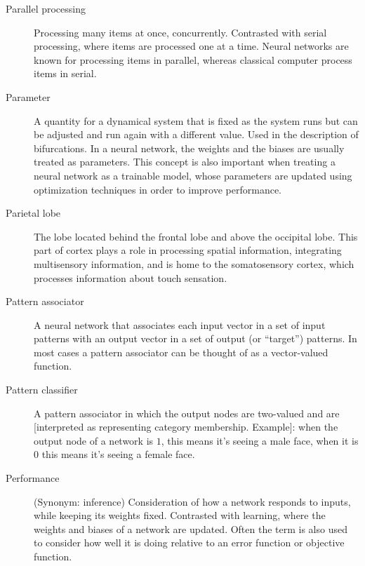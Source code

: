 \begin{description}
\item[Parallel processing] Processing many items at once, concurrently. Contrasted with serial processing, where items are processed one at a time.  Neural networks are known for processing items in parallel, whereas classical computer process items in serial.

\item[Parameter] A quantity for a dynamical system that is fixed as the system runs but can be adjusted and run again with a different value. Used in the description of bifurcations. In a neural network, the weights and the biases are usually treated as parameters. This concept is also important when treating a neural network as a trainable model, whose parameters are updated using optimization techniques in order to improve performance. 

\item[Parietal lobe] The lobe located behind the frontal lobe and above the occipital lobe. This part of cortex plays a role in processing spatial information, integrating multisensory information, and is home to the somatosensory cortex, which processes information about touch sensation.

\item[Pattern associator] A neural network that associates each input vector in a set of input patterns with an output vector in a set of output (or ``target'') patterns. In most cases a pattern associator can be thought of as a vector-valued function. 
	

\item[Pattern classifier] A pattern associator in which the output nodes are two-valued and are [interpreted as representing category membership. Example]: when the output node of a network is $1$, this means it's seeing a male face, when it is $0$ this means it's seeing a female face.


\item[Performance] (Synonym: inference) Consideration of how a network responds to inputs, while keeping its weights fixed. Contrasted with learning, where the weights and biases of a network are updated. Often the term is also used to consider how well it is doing relative to an error function or objective function.


\end{description}
